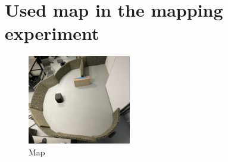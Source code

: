 \section{Used map in the mapping experiment}

\begin{figure}[H]
    \centering
    \includegraphics[width=0.4\textwidth,height=0.45\textheight,keepaspectratio]{images/Map_real.png}
    \caption{Map}
    \label{fig:mapreal}
\end{figure}